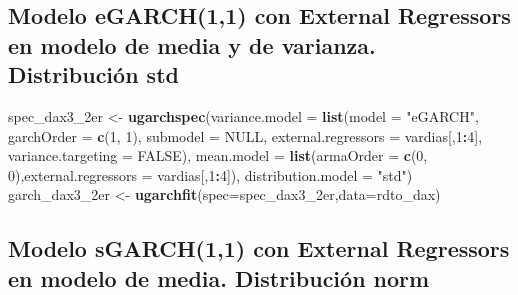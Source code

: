 \documentclass[
  11pt,
]{article}
\newenvironment{Shaded}{\begin{snugshade}}{\end{snugshade}}
\newcommand{\DataTypeTok}[1]{\textcolor[rgb]{0.13,0.29,0.53}{#1}}
\newcommand{\DecValTok}[1]{\textcolor[rgb]{0.00,0.00,0.81}{#1}}
\newcommand{\KeywordTok}[1]{\textcolor[rgb]{0.13,0.29,0.53}{\textbf{#1}}}
\newcommand{\NormalTok}[1]{#1}
\newcommand{\OperatorTok}[1]{\textcolor[rgb]{0.81,0.36,0.00}{\textbf{#1}}}
\newcommand{\OtherTok}[1]{\textcolor[rgb]{0.56,0.35,0.01}{#1}}
\newcommand{\StringTok}[1]{\textcolor[rgb]{0.31,0.60,0.02}{#1}}
\begin{document}
\hypertarget{modelo-egarch11-con-external-regressors-en-modelo-de-media-y-de-varianza.-distribuciuxf3n-std}{%
\subsection{Modelo eGARCH(1,1) con External Regressors en modelo de
media y de varianza. Distribución
std}\label{modelo-egarch11-con-external-regressors-en-modelo-de-media-y-de-varianza.-distribuciuxf3n-std}}

\begin{Shaded}
\begin{Highlighting}[]
\NormalTok{spec_dax3_2er <-}\StringTok{ }\KeywordTok{ugarchspec}\NormalTok{(}\DataTypeTok{variance.model =} \KeywordTok{list}\NormalTok{(}\DataTypeTok{model =} \StringTok{"eGARCH"}\NormalTok{, }\DataTypeTok{garchOrder =} \KeywordTok{c}\NormalTok{(}\DecValTok{1}\NormalTok{, }\DecValTok{1}\NormalTok{), }
                    \DataTypeTok{submodel =} \OtherTok{NULL}\NormalTok{, }\DataTypeTok{external.regressors =}\NormalTok{ vardias[,}\DecValTok{1}\OperatorTok{:}\DecValTok{4}\NormalTok{], }\DataTypeTok{variance.targeting =} \OtherTok{FALSE}\NormalTok{), }
                    \DataTypeTok{mean.model =} \KeywordTok{list}\NormalTok{(}\DataTypeTok{armaOrder =} \KeywordTok{c}\NormalTok{(}\DecValTok{0}\NormalTok{, }\DecValTok{0}\NormalTok{),}\DataTypeTok{external.regressors =}\NormalTok{ vardias[,}\DecValTok{1}\OperatorTok{:}\DecValTok{4}\NormalTok{]),}
               \DataTypeTok{distribution.model =} \StringTok{"std"}\NormalTok{)}
\NormalTok{garch_dax3_2er <-}\StringTok{ }\KeywordTok{ugarchfit}\NormalTok{(}\DataTypeTok{spec=}\NormalTok{spec_dax3_2er,}\DataTypeTok{data=}\NormalTok{rdto_dax)}
\end{Highlighting}
\end{Shaded}

\hypertarget{modelo-sgarch11-con-external-regressors-en-modelo-de-media.-distribuciuxf3n-norm}{%
\subsection{Modelo sGARCH(1,1) con External Regressors en modelo de
media. Distribución
norm}\label{modelo-sgarch11-con-external-regressors-en-modelo-de-media.-distribuciuxf3n-norm}}
\end{document}
